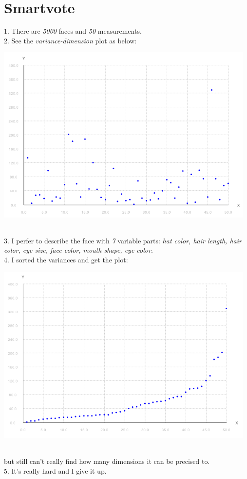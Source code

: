 \documentclass[11pt]{article} %
\begin{document}
\section{Smartvote}
1. There are \emph{5000} faces and \emph{50} measurements.\\
2.  See the \emph{variance-dimension} plot as below:\\
\centerline{
\includegraphics[width=13cm]{pic/p1}}\\
3. I perfer to describe the face with \emph{7} variable parts: \emph{hat color, hair length, hair color, eye size, face color, mouth shape, eye color}. \\
4. I sorted the variances and get the plot: \\
\centerline{
\includegraphics[width=13cm]{pic/p2}}\\
but still can't really find how many dimensions it can be precised to.\\
5. It's really hard and I give it up.\\
\end{document}
